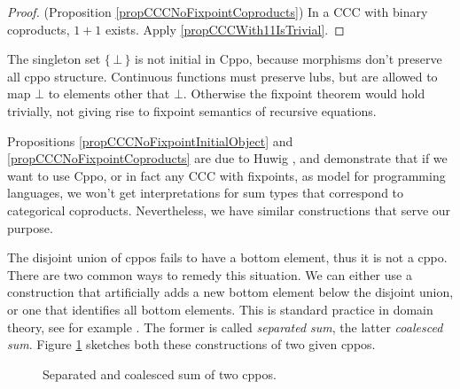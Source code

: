 \documentclass[a4paper]{article}
\newcommand{\set}[1]{\{\,#1\,\}}
\begin{document}
\begin{proof}
(Proposition \ref{propCCCNoFixpointCoproducts}) In a CCC with binary coproducts,
$1+1$ exists. Apply \ref{propCCCWith11IsTrivial}.
\end{proof}

The singleton set $\set{\bot}$ is not initial in Cppo, because morphisms don't
preserve all cppo structure. Continuous functions must preserve lubs, but are
allowed to map $\bot$ to elements other that $\bot$. Otherwise the fixpoint
theorem would hold trivially, not giving rise to fixpoint semantics of recursive
equations.

Propositions \ref{propCCCNoFixpointInitialObject} and
\ref{propCCCNoFixpointCoproducts} are due to Huwig \cite{Huwig1990}, and
demonstrate that if we want to use Cppo, or in fact any CCC with fixpoints,  as
model for programming languages, we won't get interpretations for sum types that
correspond to categorical coproducts. Nevertheless, we have similar
constructions that serve our purpose.

The disjoint union of cppos fails to have a bottom element, thus it is not a
cppo. There are two common ways to remedy this situation. We can either use a
construction that artificially adds a new bottom element below the disjoint
union, or one that identifies all bottom elements. This is standard practice in
domain theory, see for example \cite{Gunter1992}. The former is called
\emph{separated sum}, the latter \emph{coalesced sum}.  Figure
\ref{figSeparatedAndCoalescedSum} sketches both these constructions of two given
cppos.

\begin{figure}[ht]
\begin{center}


\end{center}
\caption{Separated and coalesced sum of two cppos.} \label{figSeparatedAndCoalescedSum}
\end{figure}
\end{document}
